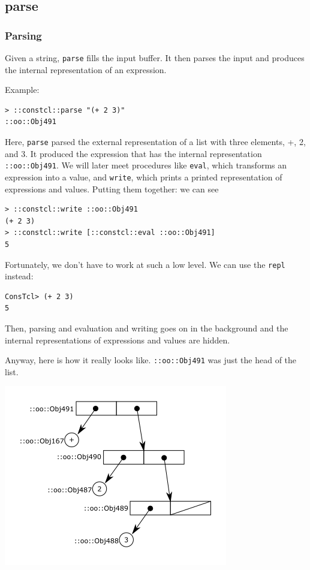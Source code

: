 \documentclass[twoside,9pt]{report}
\begin{document}
\subsection{parse}
\label{parse}
\subsubsection{Parsing}
\label{parsing}

Given a string, \texttt{parse} fills the input buffer. It then parses the input and produces the internal representation of an expression.


Example:

\noindent\makebox[\linewidth]{\rule{\linewidth}{0.4pt}}
\begin{lstlisting}
> ::constcl::parse "(+ 2 3)"
::oo::Obj491
\end{lstlisting}
\noindent\makebox[\linewidth]{\rule{\linewidth}{0.4pt}}

Here, \texttt{parse} parsed the external representation of a list with three elements, +, 2, and 3. It produced the expression that has the internal representation \texttt{::oo::Obj491}. We will later meet procedures like \texttt{eval}, which transforms an expression into a value, and \texttt{write}, which prints a printed representation of expressions and values. Putting them together: we can see

\noindent\makebox[\linewidth]{\rule{\linewidth}{0.4pt}}
\begin{lstlisting}
> ::constcl::write ::oo::Obj491
(+ 2 3)
> ::constcl::write [::constcl::eval ::oo::Obj491]
5
\end{lstlisting}
\noindent\makebox[\linewidth]{\rule{\linewidth}{0.4pt}}

Fortunately, we don't have to work at such a low level. We can use the \texttt{repl} instead:

\noindent\makebox[\linewidth]{\rule{\linewidth}{0.4pt}}
\begin{lstlisting}
ConsTcl> (+ 2 3)
5
\end{lstlisting}
\noindent\makebox[\linewidth]{\rule{\linewidth}{0.4pt}}

Then, parsing and evaluation and writing goes on in the background and the internal representations of expressions and values are hidden.


Anyway, here is how it really looks like. \texttt{::oo::Obj491} was just the head of the list.


\includegraphics{images/intreplist.png}
\end{document}
